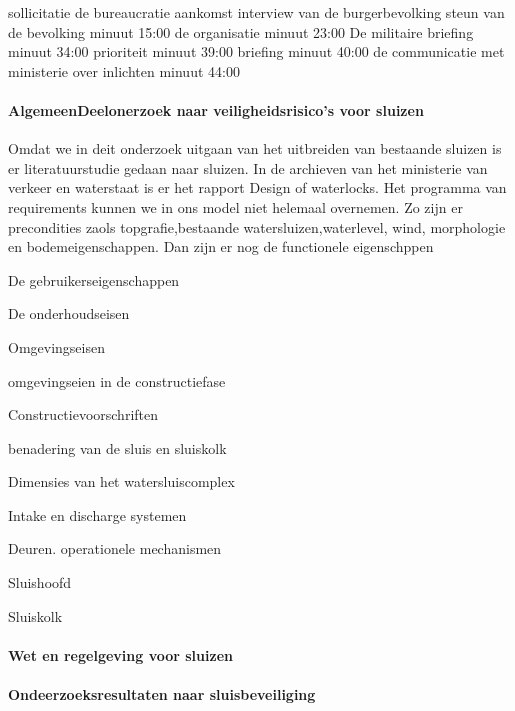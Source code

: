 \cite{ovvMortierOngevalMaliVideo} 
\cite{bnnvara13062018malirapport}
\cite{eucal11012021malimissieverlengd}
\cite{nos21052014zorgenmalimissie}
\cite{meijnders}
\cite{bnrwebredactie}
\cite{keultjes01062016malimissiecoalitie}
\cite{veenhof18012019}

\cite{isitman06012016militair}
\cite{nporadio11072016filmdemissie}
\cite{parlementairmonitor15122013mortierongeluk}
sollicitatie
de bureaucratie
aankomst
interview van de burgerbevolking
steun van de bevolking minuut 15:00
de organisatie minuut 23:00
De militaire briefing minuut 34:00
prioriteit minuut 39:00
briefing minuut 40:00
de communicatie met ministerie over inlichten minuut 44:00
\cite{DemissieFilm}



\paragraph{AlgemeenDeelonerzoek naar veiligheidsrisico's voor sluizen}
Omdat we in deit onderzoek uitgaan van het uitbreiden van bestaande sluizen is er literatuurstudie gedaan naar sluizen. In de archieven van het ministerie van verkeer en waterstaat is er het rapport Design of waterlocks\cite{CivilEngineeringDivision}.
Het programma van requirements kunnen we in ons model niet helemaal overnemen. 
Zo zijn er precondities zaols topgrafie,bestaande watersluizen,waterlevel, wind, morphologie en bodemeigenschappen.
Dan zijn er nog de functionele eigenschppen


De gebruikerseigenschappen

De onderhoudseisen

Omgevingseisen

omgevingseien in de constructiefase

Constructievoorschriften

benadering van de sluis en sluiskolk

Dimensies van het watersluiscomplex


Intake en discharge systemen

Deuren. operationele mechanismen



Sluishoofd


Sluiskolk

\paragraph{Wet en regelgeving voor sluizen}

\paragraph{Ondeerzoeksresultaten naar sluisbeveiliging}



